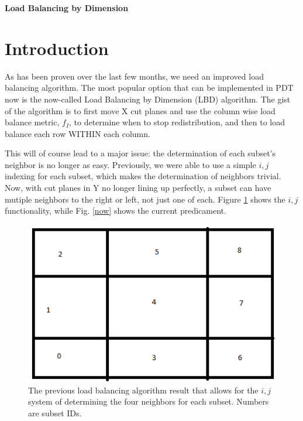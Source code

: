 \documentclass[11pt, letterpaper,titlepage,oneside]{article}
\begin{document}
\begin{center}
\Large{\textbf{Load Balancing by Dimension}}
\end{center}
\bigskip

\section*{Introduction}

As has been proven over the last few months, we need an improved load balancing algorithm. The most popular option that can be implemented in PDT now is the now-called Load Balancing by Dimension (LBD) algorithm. The gist of the algorithm is to first move X cut planes and use the column wise load balance metric, $f_I$, to determine when to stop redistribution, and then to load balance each row WITHIN each column. 

This will of course lead to a major issue: the determination of each subset's neighbor is no longer as easy. Previously, we were able to use a simple $i,j$ indexing for each subset, which makes the determination of neighbors trivial. Now, with cut planes in Y no longer lining up perfectly, a subset can have mutiple neighbors to the right or left, not just one of each. Figure \ref{initial} shows the $i,j$ functionality, while Fig. \ref{now} shows the current predicament. 

\begin{figure}[H]
\centering
\includegraphics{Initial.png}
\caption{The previous load balancing algorithm result that allows for the $i,j$ system of determining the four neighbors for each subset. Numbers are subset IDs.}
\label{initial}
\end{figure}
\end{document}
